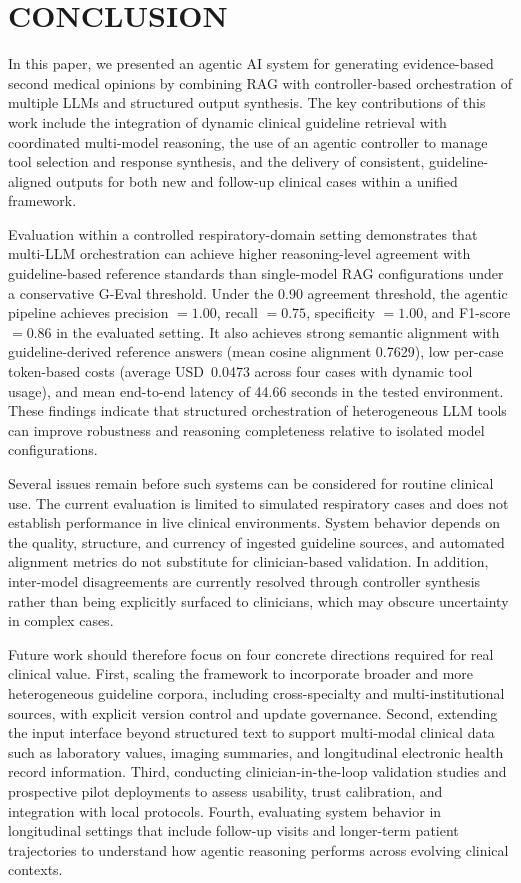 \documentclass[preprint,12pt]{elsarticle}
\begin{document}
\section{CONCLUSION}
\label{sec:conclusion}

In this paper, we presented an agentic AI system for generating evidence-based second medical opinions by combining RAG with controller-based orchestration of multiple LLMs and structured output synthesis. The key contributions of this work include the integration of dynamic clinical guideline retrieval with coordinated multi-model reasoning, the use of an agentic controller to manage tool selection and response synthesis, and the delivery of consistent, guideline-aligned outputs for both new and follow-up clinical cases within a unified framework.

Evaluation within a controlled respiratory-domain setting demonstrates that multi-LLM orchestration can achieve higher reasoning-level agreement with guideline-based reference standards than single-model RAG configurations under a conservative G-Eval threshold. Under the 0.90 agreement threshold, the agentic pipeline achieves precision \(=1.00\), recall \(=0.75\), specificity \(=1.00\), and F1-score \(=0.86\) in the evaluated setting. It also achieves strong semantic alignment with guideline-derived reference answers (mean cosine alignment 0.7629), low per-case token-based costs (average USD~0.0473 across four cases with dynamic tool usage), and mean end-to-end latency of 44.66 seconds in the tested environment. These findings indicate that structured orchestration of heterogeneous LLM tools can improve robustness and reasoning completeness relative to isolated model configurations.

Several issues remain before such systems can be considered for routine clinical use. The current evaluation is limited to simulated respiratory cases and does not establish performance in live clinical environments. System behavior depends on the quality, structure, and currency of ingested guideline sources, and automated alignment metrics do not substitute for clinician-based validation. In addition, inter-model disagreements are currently resolved through controller synthesis rather than being explicitly surfaced to clinicians, which may obscure uncertainty in complex cases.

Future work should therefore focus on four concrete directions required for real clinical value. First, scaling the framework to incorporate broader and more heterogeneous guideline corpora, including cross-specialty and multi-institutional sources, with explicit version control and update governance. Second, extending the input interface beyond structured text to support multi-modal clinical data such as laboratory values, imaging summaries, and longitudinal electronic health record information. Third, conducting clinician-in-the-loop validation studies and prospective pilot deployments to assess usability, trust calibration, and integration with local protocols. Fourth, evaluating system behavior in longitudinal settings that include follow-up visits and longer-term patient trajectories to understand how agentic reasoning performs across evolving clinical contexts.
\end{document}
